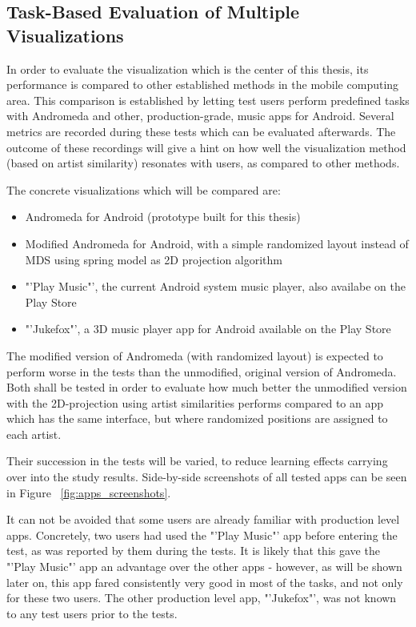 \subsection{Task-Based Evaluation of Multiple Visualizations}

In order to evaluate the visualization which is the center of this thesis, its performance is compared to other established methods in the mobile computing area. This comparison is established by letting test users perform predefined tasks with Andromeda and other, production-grade, music apps for Android. Several metrics are recorded during these tests which can be evaluated afterwards. The outcome of these recordings will give a hint on how well the visualization method (based on artist similarity) resonates with users, as compared to other methods.

The concrete visualizations which will be compared are:

\begin{itemize}
	\item Andromeda for Android (prototype built for this thesis)
	\item Modified Andromeda for Android, with a simple randomized layout instead of MDS using spring model as 2D projection algorithm
	\item "'Play Music"', the current Android system music player, also availabe on the Play Store \cite{url:playmusic}
	\item "'Jukefox"', a 3D music player app for Android available on the Play Store \cite{url:jukefox}
\end{itemize}

The modified version of Andromeda (with randomized layout) is expected to perform worse in the tests than the unmodified, original version of Andromeda. Both shall be tested in order to evaluate how much better the unmodified version with the 2D-projection using artist similarities performs compared to an app which has the same interface, but where randomized positions are assigned to each artist.

Their succession in the tests will be varied, to reduce learning effects carrying over into the study results. Side-by-side screenshots of all tested apps can be seen in Figure ~\ref{fig:apps_screenshots}.

It can not be avoided that some users are already familiar with production level apps. Concretely, two users had used the "'Play Music"' app before entering the test, as was reported by them during the tests. It is likely that this gave the "'Play Music"' app an advantage over the other apps - however, as will be shown later on, this app fared consistently very good in most of the tasks, and not only for these two users. The other production level app, "'Jukefox"', was not known to any test users prior to the tests.


